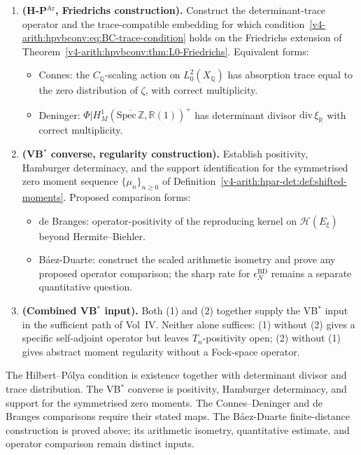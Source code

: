 \begin{enumerate}
\item \textbf{(H-P\(^{\mathrm{Ar}}\), Friedrichs construction).}
Construct the determinant-trace operator and the trace-compatible embedding
for which condition~\eqref{v4-arith:hpvbconv:eq:BC-trace-condition}
holds on the Friedrichs extension of
Theorem~\ref{v4-arith:hpvbconv:thm:L0-Friedrichs}. Equivalent forms:
\begin{itemize}
\item Connes: the \(C_{\mathbb{Q}}\)-scaling action on
\(L^{2}_{0}(X_{\mathbb{Q}})\) has absorption trace equal to the zero
distribution of \(\zeta\), with correct multiplicity.
\item Deninger: \(\Phi|H^{1}_{M}(\overline{\mathrm{Spec}\,\mathbb{Z}},\mathbb{R}(1))^{+}\)
has determinant divisor \(\mathrm{div}\,\xi_{\mathbb R}\) with correct
multiplicity.
\end{itemize}
\item \textbf{(VB\(^{*}\) converse, regularity construction).} Establish
positivity, Hamburger determinacy, and the support identification for
the symmetrised zero moment sequence \(\{\mu_{n}\}_{n\geq 0}\) of
Definition~\ref{v4-arith:hpar-det:def:shifted-moments}.
Proposed comparison forms:
\begin{itemize}
\item de Branges: operator-positivity of the reproducing kernel on
\(\mathcal{H}(E_{\xi})\) beyond Hermite--Biehler.
\item B\'aez-Duarte: construct the scaled arithmetic isometry and
prove any proposed operator comparison; the sharp rate for
\(\epsilon_N^{\mathrm{BD}}\) remains a separate quantitative question.
\end{itemize}
\item \textbf{(Combined VB\(^{*}\) input).} Both (1) and (2)
together supply the VB\(^{*}\) input in the sufficient path of
Vol~IV. Neither alone suffices: (1) without (2) gives a specific
self-adjoint operator but leaves \(T_{n}\)-positivity open; (2) without
(1) gives abstract moment regularity without a Fock-space
operator.
\end{enumerate}

\begin{remark}
\label{v4-arith:hpvbconv:rem:gain-summary}
The Hilbert--P\'olya condition is existence together with determinant
divisor and trace distribution.  The VB\(^{*}\) converse is positivity,
Hamburger determinacy, and support for the symmetrised zero moments.
The Connes--Deninger and de Branges comparisons require their
stated maps. The B\'aez-Duarte finite-distance construction is proved
above; its arithmetic isometry, quantitative estimate, and operator
comparison remain distinct inputs.
\end{remark}

